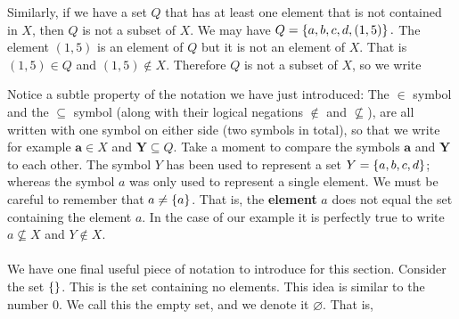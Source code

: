 	\hfil{}
	\bigskip

\noindent Similarly, if we have a set $Q$ that has at least one element that is not contained in $X$, then $Q$ is not a subset of $X$. We may have $Q = \left\{a,b,c,d,(1,5)\right\}.$ The element $(1,5)$ is an element of $Q$ but it is not an element of $X$. That is $(1,5) \in Q$ and $(1,5) \notin X$. Therefore $Q$ is not a subset of $X$, so we write \label{symbnotsubseteq}
	\bigskip
	
	\hfil{}
	\bigskip

\noindent Notice a subtle property of the notation we have just introduced: The $\in$ symbol and the $\subseteq$ symbol (along with their logical negations $\notin$ and $\not\subseteq$), are all written with one symbol on either side (two symbols in total), so that we write for example $\mathbf{a} \in X$ and $\mathbf{Y} \subseteq Q$. Take a moment to compare the symbols $\mathbf{a}$ and $\textbf{Y}$ to each other. The symbol $Y$ has been used to represent a set $Y = \left\{a,b,c,d\right\}$; whereas the symbol $a$ was only used to represent a single element. We must be careful to remember that $a \neq \left\{a\right\}$. That is, the \textbf{element} $a$ does not equal the set containing the element $a$. In the case of our example it is perfectly true to write $a \not\subseteq X$ and $Y \notin X$.  \\ \\
We have one final useful piece of notation to introduce for this section. Consider the set $\left\{\right\}$. This is the set containing no elements. This idea is similar to the number 0. We call this the empty set, \label{empty set} and we denote it $\varnothing$. \label{symbvarnothing} That is,
	\bigskip
	
	\hfil{}
	\bigskip

